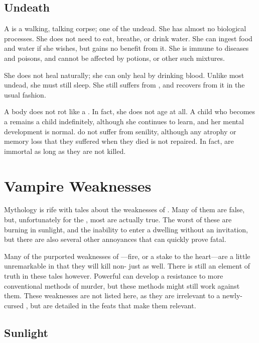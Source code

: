 \subsection{Undeath}

A {\vampire} is a walking, talking corpse; one of the undead.
She has almost no biological processes.
She does not need to eat, breathe, or drink water.
She can ingest food and water if she wishes, but gains no benefit from it.
She is immune to diseases and poisons, and cannot be affected by potions, or other such mixtures.

She does not heal naturally; she can only heal by drinking blood.
Unlike most undead, she must still sleep.
She still suffers from {\exhaustion}, and recovers from it in the usual fashion.

A {\vampirepossessive} body does not rot like a .
In fact, she does not age at all.
A child who becomes a {\vampire} remains a child indefinitely, although she continues to learn, and her mental development is normal.
{\vampires} do not suffer from senility, although any atrophy or memory loss that they suffered when they died is not repaired.
In fact, {\vampires} are immortal as long as they are not killed.

\section{Vampire Weaknesses}

Mythology is rife with tales about the weaknesses of {\vampires}.
Many of them are false, but, unfortunately for the {\vampires}, most are actually true.
The worst of these are burning in sunlight, and the inability to enter a dwelling without an invitation, but there are also several other annoyances that can quickly prove fatal.

Many of the purported weaknesses of {\vampires}---fire, or a stake to the heart---are a little unremarkable in that they will kill non-{\vampires} just as well.
There is still an element of truth in these tales however.
Powerful {\vampires} can develop a resistance to more conventional methods of murder, but these methods might still work against them.
These weaknesses are not listed here, as they are irrelevant to a newly-cursed {\vampire}, but are detailed in the feats that make them relevant.

\subsection{Sunlight}



